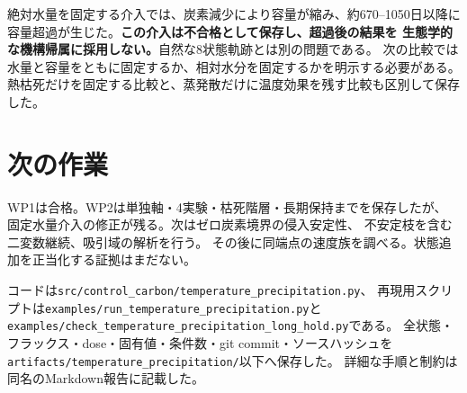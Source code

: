 \documentclass[a4paper,11pt]{ltjsarticle}
\newcommand{\code}[1]{\nolinkurl{#1}}
\begin{document}
絶対水量を固定する介入では、炭素減少により容量が縮み、約670--1050日以降に
容量超過が生じた。\textbf{この介入は不合格として保存し、超過後の結果を
生態学的な機構帰属に採用しない。}自然な8状態軌跡とは別の問題である。
次の比較では水量と容量をともに固定するか、相対水分を固定するかを明示する必要がある。
熱枯死だけを固定する比較と、蒸発散だけに温度効果を残す比較も区別して保存した。

\section{次の作業}
WP1は合格。WP2は単独軸・4実験・枯死階層・長期保持までを保存したが、
固定水量介入の修正が残る。次はゼロ炭素境界の侵入安定性、
不安定枝を含む二変数継続、吸引域の解析を行う。
その後に同端点の速度族を調べる。状態追加を正当化する証拠はまだない。

コードは\code{src/control_carbon/temperature_precipitation.py}、
再現用スクリプトは\code{examples/run_temperature_precipitation.py}と
\code{examples/check_temperature_precipitation_long_hold.py}である。
全状態・フラックス・dose・固有値・条件数・git commit・ソースハッシュを
\code{artifacts/temperature_precipitation/}以下へ保存した。
詳細な手順と制約は同名のMarkdown報告に記載した。
\end{document}
